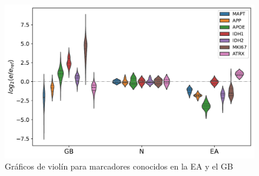 
\chapter{}\label{apx:apx2}

\begin{figure}[!htb]
	\centering
	\includegraphics[width=\linewidth]{figures/suppl2}
	\caption{Gráficos de violín para marcadores conocidos en la EA y el GB}
	\label{fig:apx2}
\end{figure}
